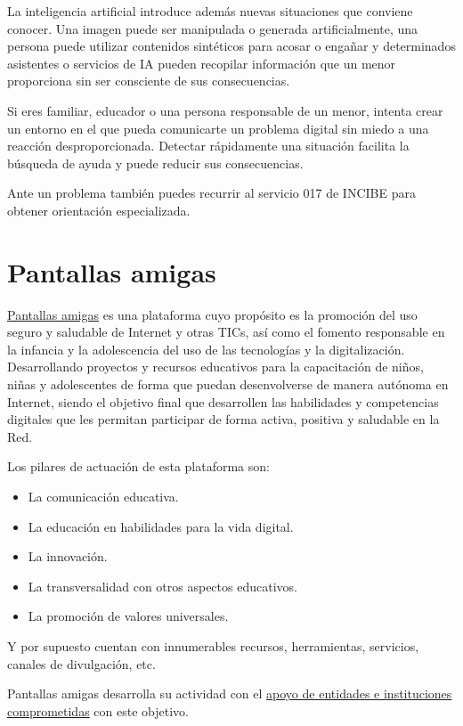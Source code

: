 \documentclass[
  spanish,
  a4paper,
  openany]{book}
\begin{document}
La inteligencia artificial introduce además nuevas situaciones que conviene conocer. Una imagen puede ser manipulada o generada artificialmente, una persona puede utilizar contenidos sintéticos para acosar o engañar y determinados asistentes o servicios de IA pueden recopilar información que un menor proporciona sin ser consciente de sus consecuencias.

Si eres familiar, educador o una persona responsable de un menor, intenta crear un entorno en el que pueda comunicarte un problema digital sin miedo a una reacción desproporcionada. Detectar rápidamente una situación facilita la búsqueda de ayuda y puede reducir sus consecuencias.

Ante un problema también puedes recurrir al servicio 017 de INCIBE para obtener orientación especializada.

\section{Pantallas amigas}\label{pantallas-amigas}

\href{https://www.pantallasamigas.net/}{Pantallas amigas} es una plataforma cuyo propósito es la promoción del uso seguro y saludable de Internet y otras TICs, así como el fomento responsable en la infancia y la adolescencia del uso de las tecnologías y la digitalización. Desarrollando proyectos y recursos educativos para la capacitación de niños, niñas y adolescentes de forma que puedan desenvolverse de manera autónoma en Internet, siendo el objetivo final que desarrollen las habilidades y competencias digitales que les permitan participar de forma activa, positiva y saludable en la Red.

Los pilares de actuación de esta plataforma son:

\begin{itemize}
\item
  La comunicación educativa.
\item
  La educación en habilidades para la vida digital.
\item
  La innovación.
\item
  La transversalidad con otros aspectos educativos.
\item
  La promoción de valores universales.
\end{itemize}

Y por supuesto cuentan con innumerables recursos, herramientas, servicios, canales de divulgación, etc.

Pantallas amigas desarrolla su actividad con el \href{https://www.pantallasamigas.net/confian-en-pantallasamigas/}{apoyo de entidades e instituciones comprometidas} con este objetivo.
\end{document}
